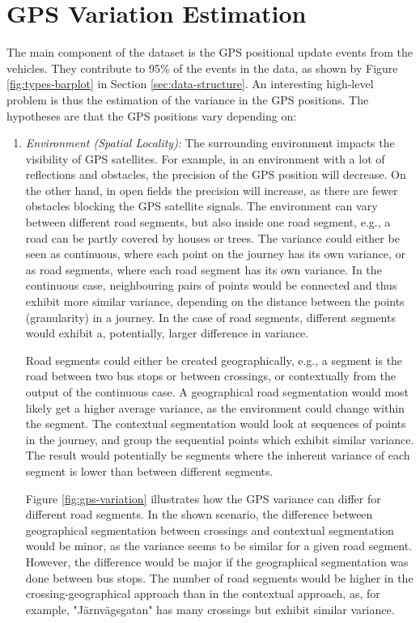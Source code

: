 \chapter{GPS Variation Estimation}
\label{cha:GPS-variation-estimation}

The main component of the dataset is the GPS positional update events from the vehicles.
They contribute to 95\% of the events in the data, as shown by Figure \ref{fig:types-barplot} in Section \ref{sec:data-structure}.
An interesting high-level problem is thus the estimation of the variance in the GPS positions.
The hypotheses are that the GPS positions vary depending on:
\begin{enumerate}
    \item \textit{Environment (Spatial Locality):} 
    The surrounding environment impacts the visibility of GPS satellites.
    For example, in an environment with a lot of reflections and obstacles, the precision of the GPS position will decrease.
    On the other hand, in open fields the precision will increase, as there are fewer obstacles blocking the GPS satellite signals.
    The environment can vary between different road segments, but also inside one road segment, e.g., a road can be partly covered by houses or trees.
    The variance could either be seen as continuous, where each point on the journey has its own variance, or as road segments, where each road segment has its own variance.
    In the continuous case, neighbouring pairs of points would be connected and thus exhibit more similar variance, depending on the distance between the points (granularity) in a journey.
    In the case of road segments, different segments would exhibit a, potentially, larger difference in variance.
    
    Road segments could either be created geographically, e.g., a segment is the road between two bus stops or between crossings, or contextually from the output of the continuous case.
    A geographical road segmentation would most likely get a higher average variance, as the environment could change within the segment.
    The contextual segmentation would look at sequences of points in the journey, and group the sequential points which exhibit similar variance.
    The result would potentially be segments where the inherent variance of each segment is lower than between different segments.

    Figure \ref{fig:gps-variation} illustrates how the GPS variance can differ for different road segments.
    In the shown scenario, the difference between geographical segmentation between crossings and contextual segmentation would be minor, as the variance seems to be similar for a given road segment.
    However, the difference would be major if the geographical segmentation was done between bus stops.
    The number of road segments would be higher in the crossing-geographical approach than in the contextual approach, as, for example, "Järnvägsgatan" has many crossings but exhibit similar variance. 
    


\end{enumerate}
